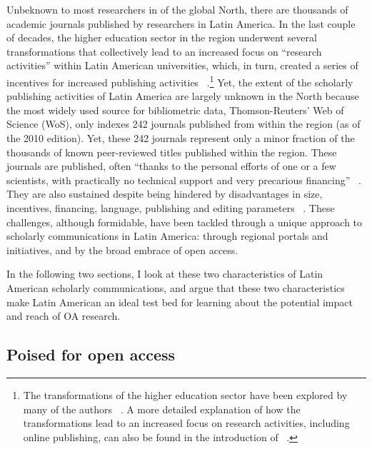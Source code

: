 Unbeknown to most researchers in of the global North, there are thousands of academic journals published by researchers in Latin America. In the last couple of decades, the higher education sector in the region underwent several transformations that collectively lead to an increased focus on ``research activities'' within Latin American universities, which, in turn, created a series of incentives for increased publishing activities ~\citep{Alperin2011a}.\footnote{The transformations of the higher education sector have been explored by many of the authors ~\citep[just to name a few]{Bernasconi2007,Didriksson2008,Gentili2005,MalagonPlata2005,Segrera2010,Fischman2008}. A more detailed explanation of how the transformations lead to an increased focus on research activities, including online publishing, can also be found in the introduction of ~\citep{Alperin2011a}.} Yet, the extent of the scholarly publishing activities of Latin America are largely unknown in the North because the most widely used source for bibliometric data, Thomson-Reuters' Web of Science (WoS), only indexes 242 journals published from within the region (as of the 2010 edition). Yet, these 242 journals represent only a minor fraction of the thousands of known peer-reviewed titles published within the region. These journals are published, often ``thanks to the personal efforts of one or a few scientists, with practically no technical support and very precarious financing'' ~\citep[p. 85]{Cetto1998}. They are also sustained despite being hindered by disadvantages in size, incentives, financing, language, publishing and editing parameters ~\citep{Figari2008}. These challenges, although formidable, have been tackled through a unique approach to scholarly communications in Latin America: through regional portals and initiatives, and by the broad embrace of open access.

In the following two sections, I look at these two characteristics of Latin American scholarly communications, and argue that these two characteristics make Latin American an ideal test bed for learning about the potential impact and reach of OA research.

\subsection{Poised for open access}
\label{poisedforopenaccess}

